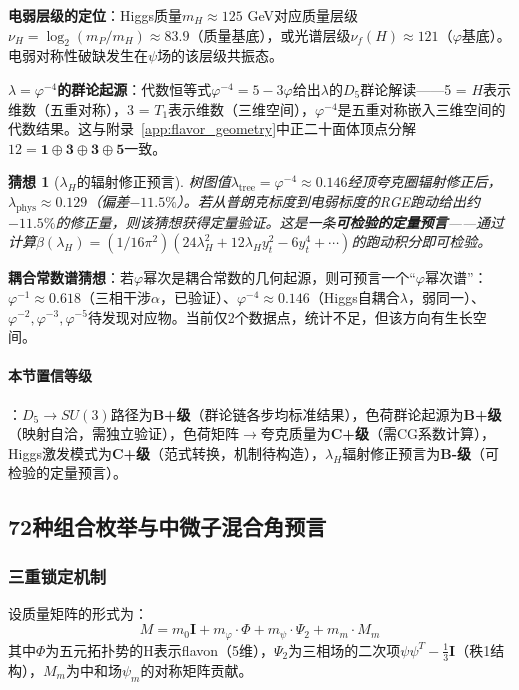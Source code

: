 \documentclass[12pt,a4paper,twocolumn]{article}
\renewcommand{\phi}{\varphi}
\newtheorem{conjecture}[theorem]{猜想}
\begin{document}
\textbf{电弱层级的定位}：Higgs质量$m_H \approx 125$ GeV对应质量层级$\nu_H = \log_2(m_P/m_H) \approx 83.9$（质量基底），或光谱层级$\nu_f(H) \approx 121$（$\phi$基底）。电弱对称性破缺发生在$\psi$场的该层级共振态。

\textbf{$\lambda = \phi^{-4}$的群论起源}：代数恒等式$\phi^{-4} = 5 - 3\phi$给出$\lambda$的$D_5$群论解读——5 = $H$表示维数（五重对称），3 = $T_1$表示维数（三维空间），$\phi^{-4}$是五重对称嵌入三维空间的代数结果。这与附录~\ref{app:flavor_geometry}中正二十面体顶点分解$12 = \mathbf{1} \oplus \mathbf{3} \oplus \mathbf{3} \oplus \mathbf{5}$一致。

\begin{conjecture}[$\lambda_H$的辐射修正预言]
\label{conj:lambda_radiation}
树图值$\lambda_{\text{tree}} = \phi^{-4} \approx 0.146$经顶夸克圈辐射修正后，$\lambda_{\text{phys}} \approx 0.129$（偏差$-11.5\%$）。若从普朗克标度到电弱标度的RGE跑动给出约$-11.5\%$的修正量，则该猜想获得定量验证。这是一条\textbf{可检验的定量预言}——通过计算$\beta(\lambda_H) = (1/16\pi^2)(24\lambda_H^2 + 12\lambda_H y_t^2 - 6y_t^4 + \cdots)$的跑动积分即可检验。
\end{conjecture}

\textbf{耦合常数谱猜想}：若$\phi$幂次是耦合常数的几何起源，则可预言一个``$\phi$幂次谱''：$\phi^{-1} \approx 0.618$（三相干涉$\alpha$，已验证）、$\phi^{-4} \approx 0.146$（Higgs自耦合$\lambda$，弱同一）、$\phi^{-2}, \phi^{-3}, \phi^{-5}$待发现对应物。当前仅2个数据点，统计不足，但该方向有生长空间。

\paragraph{本节置信等级}：$D_5 \to SU(3)$路径为\textbf{B+级}（群论链各步均标准结果），色荷群论起源为\textbf{B+级}（映射自洽，需独立验证），色荷矩阵$\to$夸克质量为\textbf{C+级}（需CG系数计算），Higgs激发模式为\textbf{C+级}（范式转换，机制待构造），$\lambda_H$辐射修正预言为\textbf{B-级}（可检验的定量预言）。

\subsection{72种组合枚举与中微子混合角预言}
\label{subsec:72_combos}

\subsubsection{三重锁定机制}

设质量矩阵的形式为：
\begin{equation}
M = m_0 \mathbf{I} + m_\phi \cdot \Phi + m_\psi \cdot \Psi_2 + m_m \cdot M_m
\label{eq:mass_matrix_flavor}
\end{equation}
其中$\Phi$为五元拓扑势的H表示flavon（5维），$\Psi_2$为三相场的二次项$\psi\psi^T - \frac{1}{3}\mathbf{I}$（秩1结构），$M_m$为中和场$\psi_m$的对称矩阵贡献。
\end{document}

